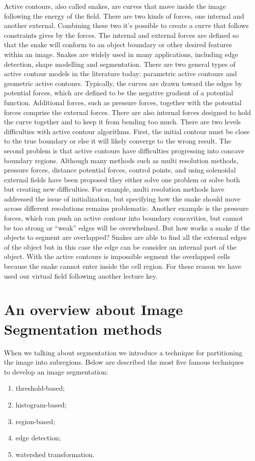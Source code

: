 Active contours, also called snakes, are curves that move inside the image following the energy of the field. There are two kinds of forces, one internal and another external. Combining these two it's possible to create a curve that follows constraints gives by the forces. The  internal  and  external  forces  are  defined  so  that  the  snake  will conform to an object boundary or other desired features within an image. Snakes are widely used  in  many  applications,  including  edge  detection,  shape  modelling and segmentation. There  are  two  general  types  of  active  contour  models  in  the literature  today:  parametric active contours and geometric active contours. Typically,  the  curves  are  drawn  toward  the edges  by  potential  forces,  which  are  defined  to  be  the  negative  gradient  of  a  potential function.  Additional  forces,  such  as  pressure  forces,  together  with  the  potential  forces comprise the external forces. There are also internal forces designed to hold the curve together and to keep it from bending too  much.  There  are  two  levels  difficulties  with  active  contour  algorithms.  First,  the  initial contour must be close to the true boundary or else it will likely converge to the wrong result. The second problem is that active contours have difficulties progressing into concave  boundary  regions.  Although  many  methods  such  as  multi resolution  methods, pressure forces, distance potential forces, control points, and using solenoidal external fields have been proposed they either solve one problem or solve both but creating new difficulties. For  example,  multi resolution  methods  have  addressed  the  issue  of  initialization,  but specifying  how  the  snake  should  move  across  different  resolutions  remains  problematic. Another example is the pressure forces, which can push an active contour into boundary concavities, but cannot be too strong or “weak” edges will be overwhelmed. But how works a snake if the objects to segment are overlapped? Snakes are able to find all the external edges of the object but in this case the edge can be consider an internal part of the object. With the active contours is impossible segment the overlapped cells because the snake cannot enter inside the cell region. For these reason we have used our virtual field following another lecture key.

\section{An overview about Image Segmentation methods}
When we talking about segmentation we introduce a technique for partitioning the image into subregions. Below are described the most five famous techniques to develop an image segmentation:
\begin{enumerate}
	\item threshold-based;
	\item histogram-based;
	\item region-based;
	\item edge detection;
	\item watershed transformation.
\end{enumerate}

